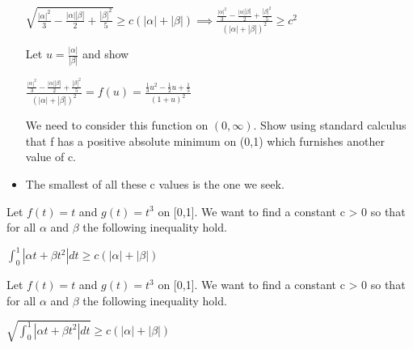 \documentclass[11pt]{SelfArxOneColBMN}
\begin{document}
\begin{exercise}
\begin{itemize}
			\begin{center}
				$\sqrt{\frac{|\alpha|^2}{3} - \frac{|\alpha||\beta|}{2} + \frac{|\beta|^2}{5}} \geq c(|\alpha| + |\beta|) \implies \frac{\frac{|\alpha|^2}{3} - \frac{|\alpha||\beta|}{2} + \frac{|\beta|^2}{5}}{(|\alpha| + |\beta|)^2} \geq c^2$
			\end{center}
			Let $u = \frac{|\alpha|}{|\beta|}$ and show
			\begin{center}
				$\frac{\frac{|\alpha|^2}{3} - \frac{|\alpha||\beta|}{2} + \frac{|\beta|^2}{5}}{(|\alpha| + |\beta|)^2} = f(u) = \frac{\frac{1}{3}u^2 - \frac{1}{2}u + \frac{1}{5}}{(1 + u)^2}$
			\end{center}
			We need to consider this function on $(0,\infty)$. Show using standard calculus that f has a positive absolute minimum on (0,1) which furnishes another value of c.
			\item The smallest of all these c values is the one we seek.
	\end{itemize}
\end{exercise}

\begin{exercise}
	Let $f(t) = t$ and $g(t) = t^3$ on [0,1]. We want to find a constant c > 0 so that for all $\alpha$ and $\beta$ the following inequality hold.
	\begin{center}
		$\int_0^1|\alpha t + \beta t^2|dt \geq c(|\alpha| + |\beta|)$
	\end{center}
\end{exercise}

\begin{exercise}
	Let $f(t) = t$ and $g(t) = t^3$ on [0,1]. We want to find a constant c > 0 so that for all $\alpha$ and $\beta$ the following inequality hold.
	\begin{center}
		$\sqrt{\int_0^1|\alpha t + \beta t^2|dt} \geq c(|\alpha| + |\beta|)$
	\end{center}
\end{exercise}
\end{document}
